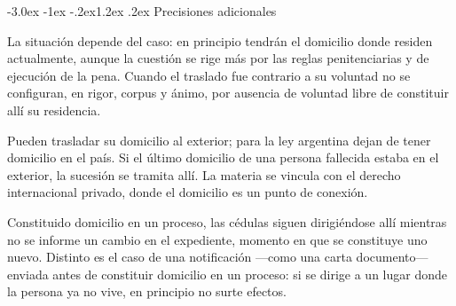 \documentclass[12pt,oneside]{book}
\makeatletter
\renewcommand\section{\@startsection{section}{1}{\z@}%
  {-3.0ex \@plus -1ex \@minus -.2ex}{1.2ex \@plus .2ex}%
  {\normalfont\large\bfseries\color{acento}}}
\makeatother
\begin{document}
\section{Precisiones adicionales}

\begin{description}[leftmargin=0pt,style=unboxed]
\item[Personas privadas de su libertad.] La situación depende del caso: en principio tendrán el domicilio donde residen actualmente, aunque la cuestión se rige más por las reglas penitenciarias y de ejecución de la pena. Cuando el traslado fue contrario a su voluntad no se configuran, en rigor, corpus y ánimo, por ausencia de voluntad libre de constituir allí su residencia. %
\item[Argentinos residentes en el exterior.] Pueden trasladar su domicilio al exterior; para la ley argentina dejan de tener domicilio en el país. Si el último domicilio de una persona fallecida estaba en el exterior, la sucesión se tramita allí. La materia se vincula con el derecho internacional privado, donde el domicilio es un punto de conexión.
\item[Domicilio procesal y cambio de domicilio.] Constituido domicilio en un proceso, las cédulas siguen dirigiéndose allí mientras no se informe un cambio en el expediente, momento en que se constituye uno nuevo. Distinto es el caso de una notificación ---como una carta documento--- enviada antes de constituir domicilio en un proceso: si se dirige a un lugar donde la persona ya no vive, en principio no surte efectos.
\end{description}
\end{document}
